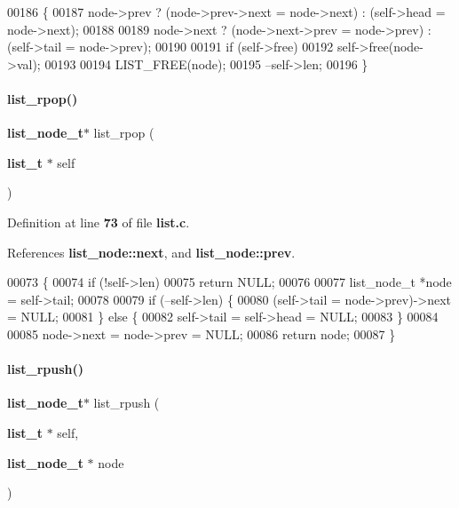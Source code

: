 \begin{DoxyCode}
00186                                                   \{
00187   node->prev ? (node->prev->next = node->next) : (self->head = node->next);
00188 
00189   node->next ? (node->next->prev = node->prev) : (self->tail = node->prev);
00190 
00191   \textcolor{keywordflow}{if} (self->free)
00192     \textcolor{keyword}{self}->free(node->val);
00193 
00194   LIST_FREE(node);
00195   --\textcolor{keyword}{self}->len;
00196 \}
\end{DoxyCode}
\mbox{\label{a00110_a53460b319b561ce2201bbf95450f1af7}} 
\paragraph{list\+\_\+rpop()}
{\footnotesize\ttfamily \textbf{ list\+\_\+node\+\_\+t}$\ast$ list\+\_\+rpop (\begin{DoxyParamCaption}\item[{\textbf{ list\+\_\+t} $\ast$}]{self }\end{DoxyParamCaption})}



Definition at line \textbf{ 73} of file \textbf{ list.\+c}.



References \textbf{ list\+\_\+node\+::next}, and \textbf{ list\+\_\+node\+::prev}.


\begin{DoxyCode}
00073                                      \{
00074   \textcolor{keywordflow}{if} (!self->len)
00075     \textcolor{keywordflow}{return} NULL;
00076 
00077   list_node_t *node = \textcolor{keyword}{self}->tail;
00078 
00079   \textcolor{keywordflow}{if} (--self->len) \{
00080     (\textcolor{keyword}{self}->tail = node->prev)->next = NULL;
00081   \} \textcolor{keywordflow}{else} \{
00082     \textcolor{keyword}{self}->tail = \textcolor{keyword}{self}->head = NULL;
00083   \}
00084 
00085   node->next = node->prev = NULL;
00086   \textcolor{keywordflow}{return} node;
00087 \}
\end{DoxyCode}
\mbox{\label{a00110_a4edfa9b7742154bff4fc2cb05d044af9}} 
\paragraph{list\+\_\+rpush()}
{\footnotesize\ttfamily \textbf{ list\+\_\+node\+\_\+t}$\ast$ list\+\_\+rpush (\begin{DoxyParamCaption}\item[{\textbf{ list\+\_\+t} $\ast$}]{self,  }\item[{\textbf{ list\+\_\+node\+\_\+t} $\ast$}]{node }\end{DoxyParamCaption})}



